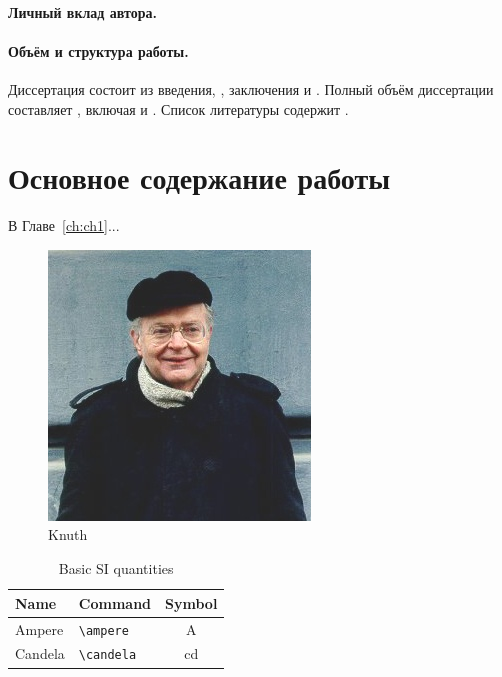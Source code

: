 \paragraph*{Личный вклад автора.}


\paragraph*{Объём и структура работы.}
Диссертация состоит из введения,
,
заключения и
.
%
Полный объём диссертации составляет
, включая
 и
.
Список литературы содержит
.


\newpage
\section*{Основное содержание работы}

В Главе~\ref{ch:ch1}...

\begin{figure}
	\centering
	\includegraphics[width=0.4\linewidth]{images/knuth}
	\caption{Knuth}
\end{figure}

\begin{table}
	\centering
	\caption{Basic SI quantities}%
	\begin{tabular}{llc}
		\toprule
		Name 	& 	Command 	& 	Symbol         \\
		\midrule
		Ampere     & \verb|\ampere| & \si{\ampere}   \\
		Candela   & \verb|\candela| & \si{\candela}  \\
		\bottomrule
	\end{tabular}
\end{table}

